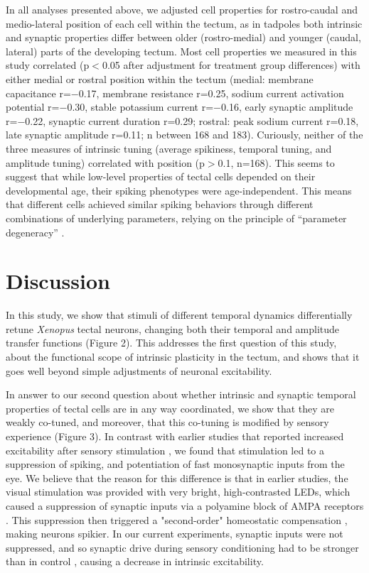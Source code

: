 \documentclass{article}
\begin{document}
In all analyses presented above, we adjusted cell properties for rostro-caudal and medio-lateral position of each cell within the tectum, as in tadpoles both intrinsic \citep{hamodi2014} and synaptic properties \citep{wu1996,khakhalin2012} differ between older (rostro-medial) and younger (caudal, lateral) parts of the developing tectum. Most cell properties we measured in this study correlated (p$<$0.05 after adjustment for treatment group differences) with either medial or rostral position within the tectum (medial: membrane capacitance r=$-$0.17, membrane resistance r=0.25, sodium current activation potential r=$-$0.30, stable potassium current r=$-$0.16, early synaptic amplitude r=$-$0.22, synaptic current duration r=0.29; rostral: peak sodium current r=0.18, late synaptic amplitude r=0.11; n between 168 and 183). Curiously, neither of the three measures of intrinsic tuning (average spikiness, temporal tuning, and amplitude tuning) correlated with position (p$>$0.1, n=168). This seems to suggest that while low-level properties of tectal cells depended on their developmental age, their spiking phenotypes were age-independent. This means that different cells achieved similar spiking behaviors through different combinations of underlying parameters, relying on the principle of “parameter degeneracy” \citep{prinz2004degeneracy,drion2015}.


\section*{Discussion}

In this study, we show that stimuli of different temporal dynamics differentially retune \textit{Xenopus} tectal neurons, changing both their temporal and amplitude transfer functions (Figure 2). This addresses the first question of this study, about the functional scope of intrinsic plasticity in the tectum, and shows that it goes well beyond simple adjustments of neuronal excitability.

In answer to our second question about whether intrinsic and synaptic temporal properties of tectal cells are in any way coordinated, we show that they are weakly co-tuned, and moreover, that this co-tuning is modified by sensory experience (Figure 3). In contrast with earlier studies that reported increased excitability after sensory stimulation \citep{aizenman2003, dong2009, ciarleglio2015}, we found that stimulation led to a suppression of spiking, and potentiation of fast monosynaptic inputs from the eye. We believe that the reason for this difference is that in earlier studies, the visual stimulation was provided with very bright, high-contrasted LEDs, which caused a suppression of synaptic inputs via a polyamine block of AMPA receptors \citep{aizenman2003}. This suppression then triggered a "second-order" homeostatic compensation \citep{turrigiano2011, tien2018}, making neurons spikier. In our current experiments, synaptic inputs were not suppressed, and so synaptic drive during sensory conditioning had to be stronger than in control \citep{khakhalin2014}, causing a decrease in intrinsic excitability.
\end{document}
